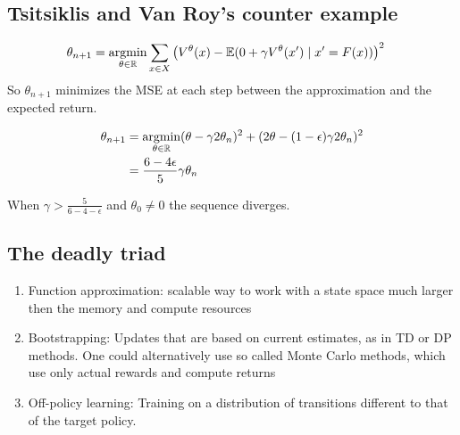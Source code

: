 \subsection{Tsitsiklis and Van Roy's counter example}



\begin{align*}
    \theta_{n+1}&=\operatorname*{\text{argmin}}_{\theta\in\mathbb{R}}\sum_{x\in X}\left(V^\theta(x)-\mathbb{E}(0+\gamma V^\theta(x')\mid x'=F(x))\right)^2
\end{align*}
So \(\theta_{n+1}\) minimizes the MSE at each step between the approximation and the expected return.

\begin{align*}
    \theta_{n+1}&=\operatorname*{\text{argmin}}_{\theta\in \mathbb{R}} (\theta-\gamma 2\theta_n)^2+(2\theta-(1-\epsilon)\gamma 2 \theta_n)^2  \\
    &=\frac{6-4\epsilon}{5}\gamma\theta_n
\end{align*}

When \(\gamma>\frac{5}{6-4-\epsilon}\) and \(\theta_0\neq 0\) the sequence diverges.

\subsection{The deadly triad}

\begin{enumerate}
    \item Function approximation: scalable way to work with a state space much larger then the memory and compute resources 
    \item Bootstrapping: Updates that are based on current estimates, as in TD or DP methods. One could alternatively use so called Monte Carlo methods, which use only actual rewards and compute returns  
    \item Off-policy learning: Training on a distribution of transitions different to that of the target policy.
\end{enumerate}

